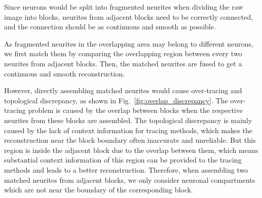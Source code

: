 Since neurons would be split into fragmented neurites when dividing the raw image into blocks, neurites from adjacent blocks need to be correctly connected, and the connection should be as continuous and smooth as possible.



As fragmented neurites in the overlapping area may belong to different neurons, we first match them  by comparing the overlapping region between every two neurites from adjacent blocks.
%
Then, the matched neurites are fused to get a continuous and smooth reconstruction. 

However, directly assembling matched neurites would cause over-tracing and topological discrepancy, as shown in Fig.~\ref{fig:overlap_discrepancy}.
The over-tracing problem  is caused by the overlap between blocks when the respective neurites from these blocks are assembled.
The topological discrepancy  is mainly caused by the lack of context information for tracing methods, which makes the reconstruction near the block boundary often inaccurate and unreliable.
But this region is inside the adjacent block due to the overlap between them, which means substantial context information of this region can be provided to the tracing methods and leads to a better reconstruction.
Therefore, when assembling two matched neurites from adjacent blocks, we only consider neuronal compartments which are not near the boundary of the corresponding block. 

